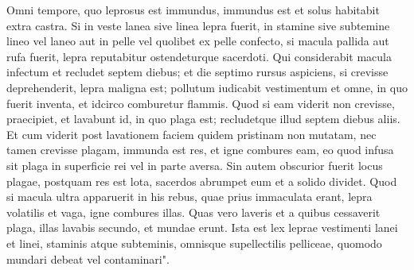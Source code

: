 \begin{biblechapter}
\verse Omni tempore, quo leprosus est immundus, immundus est et solus habitabit extra castra. 
\verse Si in veste lanea sive linea lepra fuerit, 
\verse in stamine sive subtemine lineo vel laneo aut in pelle vel quolibet ex pelle confecto, 
\verse si macula pallida aut rufa fuerit, lepra reputabitur ostendeturque sacerdoti. 
\verse Qui considerabit macula infectum et recludet septem diebus; 
\verse et die septimo rursus aspiciens, si crevisse deprehenderit, lepra maligna est; pollutum iudicabit vestimentum et omne, in quo fuerit inventa, 
\verse et idcirco comburetur flammis. 
\verse Quod si eam viderit non crevisse, 
\verse praecipiet, et lavabunt id, in quo plaga est; recludetque illud septem diebus aliis. 
\verse Et cum viderit post lavationem faciem quidem pristinam non mutatam, nec tamen crevisse plagam, immunda est res, et igne combures eam, eo quod infusa sit plaga in superficie rei vel in parte aversa. 
\verse Sin autem obscurior fuerit locus plagae, postquam res est lota, sacerdos abrumpet eum et a solido dividet. 
\verse Quod si macula ultra apparuerit in his rebus, quae prius immaculata erant, lepra volatilis et vaga, igne combures illas. 
\verse Quas vero laveris et a quibus cessaverit plaga, illas lavabis secundo, et mundae erunt. 
\verse Ista est lex leprae vestimenti lanei et linei, staminis atque subteminis, omnisque supellectilis pelliceae, quomodo mundari debeat vel contaminari". 
\end{biblechapter}

